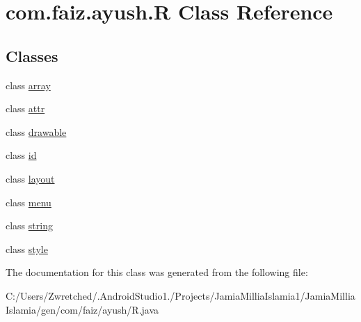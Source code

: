 \hypertarget{classcom_1_1faiz_1_1ayush_1_1_r}{}\section{com.\+faiz.\+ayush.\+R Class Reference}
\label{classcom_1_1faiz_1_1ayush_1_1_r}
\subsection*{Classes}
\begin{DoxyCompactItemize}
\item 
class \hyperlink{classcom_1_1faiz_1_1ayush_1_1_r_1_1array}{array}
\item 
class \hyperlink{classcom_1_1faiz_1_1ayush_1_1_r_1_1attr}{attr}
\item 
class \hyperlink{classcom_1_1faiz_1_1ayush_1_1_r_1_1drawable}{drawable}
\item 
class \hyperlink{classcom_1_1faiz_1_1ayush_1_1_r_1_1id}{id}
\item 
class \hyperlink{classcom_1_1faiz_1_1ayush_1_1_r_1_1layout}{layout}
\item 
class \hyperlink{classcom_1_1faiz_1_1ayush_1_1_r_1_1menu}{menu}
\item 
class \hyperlink{classcom_1_1faiz_1_1ayush_1_1_r_1_1string}{string}
\item 
class \hyperlink{classcom_1_1faiz_1_1ayush_1_1_r_1_1style}{style}
\end{DoxyCompactItemize}


The documentation for this class was generated from the following file\+:\begin{DoxyCompactItemize}
\item 
C\+:/\+Users/\+Zwretched/.\+Android\+Studio1./\+Projects/\+Jamia\+Millia\+Islamia1/\+Jamia\+Millia\+Islamia/gen/com/faiz/ayush/R.\+java\end{DoxyCompactItemize}
